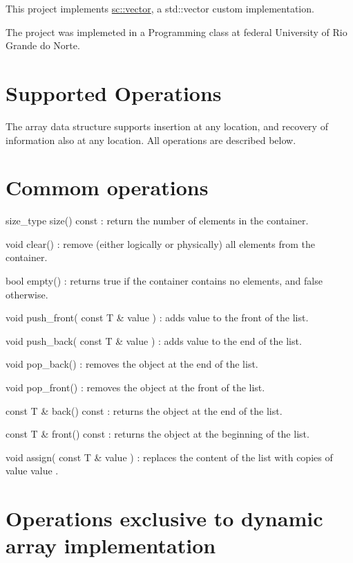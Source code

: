 This project implements {\ttfamily \mbox{\hyperlink{classsc_1_1vector}{sc\+::vector}}}, a {\ttfamily std\+::vector} custom implementation.

The project was implemeted in a Programming class at federal University of Rio Grande do Norte.

\section*{Supported Operations}

The array data structure supports insertion at any location, and recovery of information also at any location. All operations are described below.

\section*{Commom operations}


\begin{DoxyItemize}
\item {\ttfamily size\+\_\+type size() const} \+: return the number of elements in the container.
\item {\ttfamily void clear()} \+: remove (either logically or physically) all elements from the container.
\item {\ttfamily bool empty()} \+: returns true if the container contains no elements, and false otherwise.
\item {\ttfamily void push\+\_\+front( const T \& value )} \+: adds value to the front of the list.
\item {\ttfamily void push\+\_\+back( const T \& value )} \+: adds value to the end of the list.
\item {\ttfamily void pop\+\_\+back()} \+: removes the object at the end of the list.
\item {\ttfamily void pop\+\_\+front()} \+: removes the object at the front of the list.
\item {\ttfamily const T \& back() const} \+: returns the object at the end of the list.
\item {\ttfamily const T \& front() const} \+: returns the object at the beginning of the list.
\item {\ttfamily void assign( const T \& value )} \+: replaces the content of the list with copies of value {\ttfamily value} .
\end{DoxyItemize}

\section*{Operations exclusive to dynamic array implementation}


